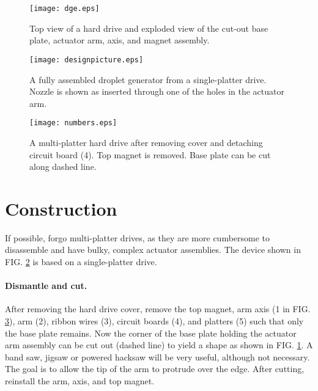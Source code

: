 \documentclass[aip,rsi,reprint,graphicx]{revtex4-1} %
\begin{document}

\begin{figure}
\centering
\texttt{[image: dge.eps]}
\caption{Top view of a hard drive and exploded view of the cut-out base
plate, actuator arm, axis, and magnet assembly. \label{fig:designschematic}}
\end{figure}
\begin{figure}
\centering
\texttt{[image: designpicture.eps]}
\caption{A fully assembled droplet generator from a single-platter drive. Nozzle is shown as inserted
through one of the holes in the actuator arm. \label{fig:photo}}
\end{figure}
\begin{figure}
\centering
\texttt{[image: numbers.eps]}
\caption{A multi-platter hard drive after removing cover and detaching circuit board (4). Top
        magnet is removed. Base plate can be cut along dashed line. \label{fig:numbers}}
\end{figure}


\section{Construction}
If possible, forgo multi-platter drives, as they are more cumbersome to disassemble and have
bulky, complex actuator assemblies. The device shown in FIG. \ref{fig:photo}
is based on a single-platter drive.

\paragraph{Dismantle and cut.} After removing the hard drive cover, remove
the top magnet, arm axis (1 in FIG. \ref{fig:numbers}), arm (2), ribbon wires (3), circuit boards (4), and
platters (5) such that only the base plate remains. Now the corner of the base plate holding
the actuator arm assembly can be cut out (dashed line) to yield a shape as shown in FIG.
\ref{fig:designschematic}. A band saw, jigsaw or powered hacksaw will be very
useful, although not necessary. The goal is to allow the tip of the arm to
protrude over the edge. After cutting, reinstall the arm, axis, and top magnet.
\end{document}
